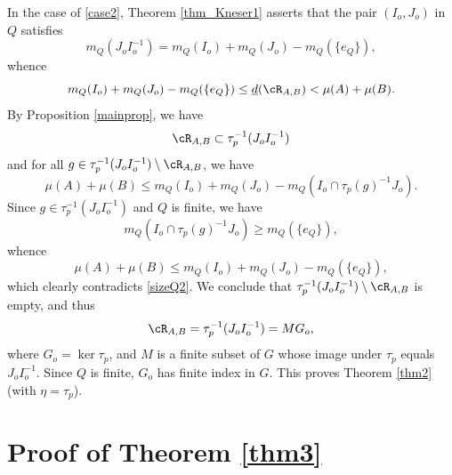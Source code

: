 In the case of \eqref{case2}, Theorem \ref{thm_Kneser1} asserts that the pair $(I_o,J_o)$ in $Q$ satisfies
\[
m_Q(J_o I_o^{-1}) = m_Q(I_o) + m_Q(J_o) - m_Q(\{e_Q\}),
\]
whence
\begin{equation}
\label{sizeQ2}
m_Q(I_o) + m_Q(J_o) - m_Q(\{e_Q\}) \leq \underline{d}(\cR_{A,B}) < \mu(A) + \mu(B).
\end{equation}
By Proposition \ref{mainprop}, we have
\[
\cR_{A,B} \subset \tau_p^{-1}(J_o I_o^{-1})
\]
and for all $g \in \tau_p^{-1}(J_o I_o^{-1}) \setminus \cR_{A,B}$, we have
\[
\mu(A) + \mu(B) \leq m_Q(I_o) + m_Q(J_o) - m_Q(I_o \cap \tau_p(g)^{-1}J_o).
\]
Since $g \in \tau_p^{-1}(J_o I_o^{-1})$ and $Q$ is finite, we have
\[
m_Q(I_o \cap \tau_p(g)^{-1}J_o) \geq m_Q(\{e_Q\}),
\]
whence
\[
\mu(A) + \mu(B) \leq m_Q(I_o) + m_Q(J_o) - m_Q(\{e_Q\}),
\]
which clearly contradicts \eqref{sizeQ2}. We conclude that $\tau_p^{-1}(J_o I_o^{-1}) \setminus \cR_{A,B}$ is empty, and thus
\[
\cR_{A,B} = \tau_p^{-1}(J_o I_o^{-1}) = MG_o,
\]
where $G_o = \ker \tau_p$, and $M$ is a finite subset of $G$ whose image under $\tau_p$ equals $J_o I_o^{-1}$.
Since $Q$ is finite, $G_o$ has finite index in $G$. This proves Theorem \ref{thm2} (with $\eta = \tau_p$).

\section{Proof of Theorem \ref{thm3}}

